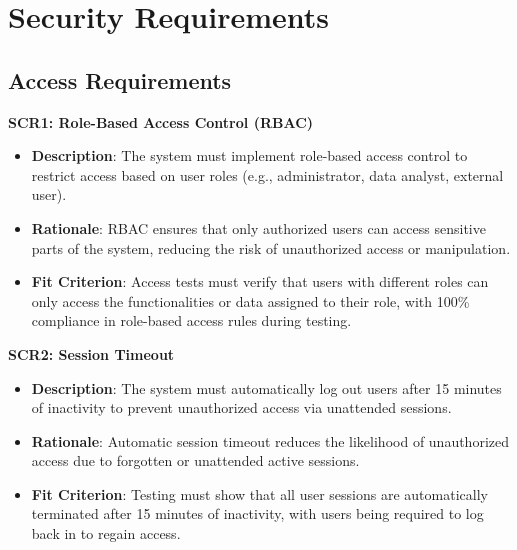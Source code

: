 \documentclass[12pt]{article}
\begin{document}
\section{Security Requirements}
\subsection{Access Requirements}
\textbf{SCR1: Role-Based Access Control (RBAC)}
\begin{itemize}
    \item \textbf{Description}: The system must implement role-based access
    control to restrict access based on user roles (e.g., administrator, data
    analyst, external user).
    \item \textbf{Rationale}: RBAC ensures that only authorized users can access
    sensitive parts of the system, reducing the risk of unauthorized access or
    manipulation.
    \item \textbf{Fit Criterion}: Access tests must verify that users with
    different roles can only access the functionalities or data assigned to
    their role, with 100\% compliance in role-based access rules during testing.
\end{itemize}
\textbf{SCR2: Session Timeout}
\begin{itemize}
    \item \textbf{Description}: The system must automatically log out users
    after 15 minutes of inactivity to prevent unauthorized access via unattended
    sessions.
    \item \textbf{Rationale}: Automatic session timeout reduces the likelihood
    of unauthorized access due to forgotten or unattended active sessions.
    \item \textbf{Fit Criterion}: Testing must show that all user sessions are
    automatically terminated after 15 minutes of inactivity, with users being
    required to log back in to regain access.
\end{itemize}
\end{document}
